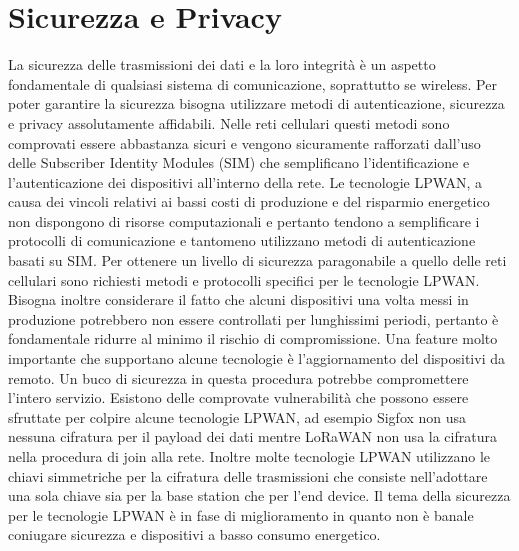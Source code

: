 \documentclass[12pt,a4paper,openright,twoside]{report}
\begin{document}
\section{Sicurezza e Privacy}
La sicurezza delle trasmissioni dei dati e la loro integrit\`a \`e un aspetto fondamentale di qualsiasi sistema di comunicazione, soprattutto se wireless. Per poter garantire la sicurezza bisogna utilizzare metodi di autenticazione, sicurezza e privacy assolutamente affidabili.  
Nelle reti cellulari questi metodi sono comprovati essere abbastanza sicuri e vengono sicuramente rafforzati dall'uso delle Subscriber Identity Modules (SIM) che semplificano l'identificazione e l'autenticazione dei dispositivi all'interno della rete.
Le tecnologie LPWAN, a causa dei vincoli relativi ai bassi costi di produzione e del risparmio energetico non dispongono di risorse computazionali e pertanto tendono a semplificare i protocolli di comunicazione e tantomeno utilizzano metodi di autenticazione basati su SIM.
Per ottenere un livello di sicurezza paragonabile a quello delle reti cellulari sono richiesti metodi e protocolli specifici per le tecnologie LPWAN.
Bisogna inoltre considerare il fatto che alcuni dispositivi una volta messi in produzione potrebbero non essere controllati per lunghissimi periodi, pertanto \`e fondamentale ridurre al minimo il rischio di compromissione. Una feature molto importante che supportano alcune tecnologie \`e l'aggiornamento del dispositivi da remoto. Un buco di sicurezza in questa procedura potrebbe compromettere l'intero servizio.   
Esistono delle comprovate vulnerabilit\`a che possono essere sfruttate per colpire alcune tecnologie LPWAN, ad esempio Sigfox non usa nessuna cifratura per il payload dei dati mentre LoRaWAN non usa la cifratura nella procedura di join alla rete. 
Inoltre molte tecnologie LPWAN utilizzano le chiavi simmetriche per la cifratura delle trasmissioni che consiste nell'adottare una sola chiave sia per la base station che per l'end device.
Il tema della sicurezza per le tecnologie LPWAN \`e in fase di miglioramento in quanto non \`e banale coniugare sicurezza e dispositivi a basso consumo energetico.   
\end{document}
